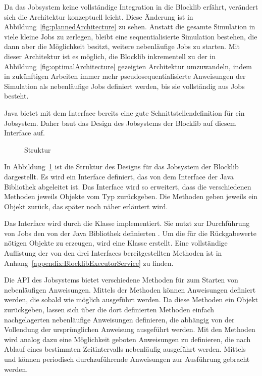 Da das Jobsystem keine vollständige Integration in die Blocklib erfährt, verändert sich die Architektur konzeptuell leicht. Diese Änderung ist in Abbildung~\ref{fig:plannedArchitecture} zu sehen. Anstatt die gesamte Simulation in viele kleine Jobs zu zerlegen, bleibt eine sequentialisierte Simulation bestehen, die dann aber die Möglichkeit besitzt, weitere nebenläufige Jobs zu starten. Mit dieser Architektur ist es möglich, die Blocklib inkrementell zu der in Abbildung~\ref{fig:optimalArchitecture} gezeigten Architektur umzuwandeln, indem in zukünftigen Arbeiten immer mehr pseudosequentialisierte Anweisungen der Simulation als nebenläufige Jobs definiert werden, bis sie vollständig aus Jobs besteht.

Java bietet mit dem Interface  bereits eine gute Schnittstellendefinition für ein Jobsystem. Daher baut das Design des Jobsystems der Blocklib auf diesem Interface auf. 

\begin{figure}
	
	\caption{Struktur }\label{fig:GrobesDesign}
\end{figure}

In Abbildung~\ref{fig:GrobesDesign} ist die Struktur des Designs für das Jobsystem der Blocklib dargestellt. Es wird ein Interface  definiert, das von dem Interface  der Java Bibliothek abgeleitet ist. Das Interface wird so erweitert, dass die verschiedenen  Methoden jeweils Objekte vom Typ  zurückgeben. Die  Methoden geben jeweils ein  Objekt zurück, das später noch näher erläutert wird.

Das Interface  wird durch die Klasse  implementiert. Sie nutzt zur Durchführung von Jobs den von der Java Bibliothek definierten . Um die für die Rückgabewerte nötigen  Objekte zu erzeugen, wird eine Klasse  erstellt. Eine vollständige Auflistung der von den drei Interfaces bereitgestellten Methoden ist in Anhang~\ref{appendix:BlocklibExecutorService} zu finden. 

Die API des Jobsystems bietet verschiedene Methoden für zum Starten von nebenläufigen Anweisungen. Mittels der  Methoden können Anweisungen definiert werden, die sobald wie möglich ausgeführt werden. Da diese Methoden ein  Objekt zurückgeben, lassen sich über die dort definierten Methoden einfach nachgelagerten nebenläufige Anweisungen definieren, die abhängig von der Vollendung der ursprünglichen Anweisung ausgeführt werden. Mit den  Methoden wird analog dazu eine Möglichkeit geboten Anweisungen zu definieren, die nach Ablauf eines bestimmten Zeitintervalls nebenläufig ausgeführt werden. Mittels  und  können periodisch durchzuführende Anweisungen zur Ausführung gebracht werden.